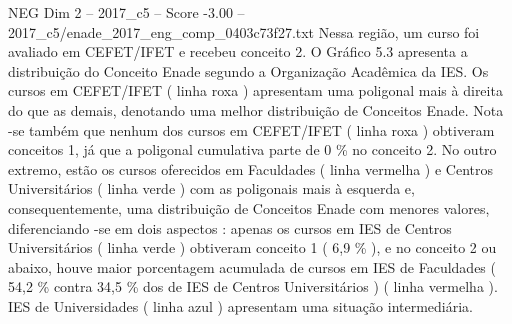 \begin{textsample}{NEG Dim 2 – 2017\_c5 – Score -3.00 – 2017\_c5/enade\_2017\_eng\_comp\_0403c73f27.txt}
Nessa região, um curso foi avaliado em CEFET/IFET e recebeu conceito 2.
O Gráfico 5.3 apresenta a distribuição do Conceito Enade segundo a Organização Acadêmica da IES.
Os cursos em CEFET/IFET ( linha roxa ) apresentam uma poligonal mais à direita do que as demais, denotando uma melhor distribuição de Conceitos Enade.
Nota -se também que nenhum dos cursos em CEFET/IFET ( linha roxa ) obtiveram conceitos 1, já que a poligonal cumulativa parte de 0 \% no conceito 2.
No outro extremo, estão os cursos oferecidos em Faculdades ( linha vermelha ) e Centros Universitários ( linha verde ) com as poligonais mais à esquerda e, consequentemente, uma distribuição de Conceitos Enade com menores valores, diferenciando -se em dois aspectos : apenas os cursos em IES de Centros Universitários ( linha verde ) obtiveram conceito 1 ( 6,9 \% ), e no conceito 2 ou abaixo, houve maior porcentagem acumulada de cursos em IES de Faculdades ( 54,2 \% contra 34,5 \% dos de IES de Centros Universitários ) ( linha vermelha ).
IES de Universidades ( linha azul ) apresentam uma situação intermediária.

\end{textsample}
